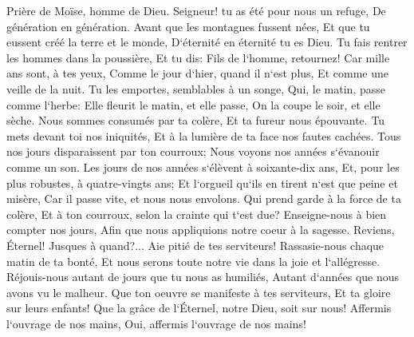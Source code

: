 \verse Prière de Moïse, homme de Dieu. Seigneur! tu as été pour nous un refuge, De génération en génération. 
\verse Avant que les montagnes fussent nées, Et que tu eussent créé la terre et le monde, D`éternité en éternité tu es Dieu. 
\verse Tu fais rentrer les hommes dans la poussière, Et tu dis: Fils de l`homme, retournez! 
\verse Car mille ans sont, à tes yeux, Comme le jour d`hier, quand il n`est plus, Et comme une veille de la nuit. 
\verse Tu les emportes, semblables à un songe, Qui, le matin, passe comme l`herbe: 
\verse Elle fleurit le matin, et elle passe, On la coupe le soir, et elle sèche. 
\verse Nous sommes consumés par ta colère, Et ta fureur nous épouvante. 
\verse Tu mets devant toi nos iniquités, Et à la lumière de ta face nos fautes cachées. 
\verse Tous nos jours disparaissent par ton courroux; Nous voyons nos années s`évanouir comme un son. 
\verse Les jours de nos années s`élèvent à soixante-dix ans, Et, pour les plus robustes, à quatre-vingts ans; Et l`orgueil qu`ils en tirent n`est que peine et misère, Car il passe vite, et nous nous envolons. 
\verse Qui prend garde à la force de ta colère, Et à ton courroux, selon la crainte qui t`est due? 
\verse Enseigne-nous à bien compter nos jours, Afin que nous appliquions notre coeur à la sagesse. 
\verse Reviens, Éternel! Jusques à quand?... Aie pitié de tes serviteurs! 
\verse Rassasie-nous chaque matin de ta bonté, Et nous serons toute notre vie dans la joie et l`allégresse. 
\verse Réjouis-nous autant de jours que tu nous as humiliés, Autant d`années que nous avons vu le malheur. 
\verse Que ton oeuvre se manifeste à tes serviteurs, Et ta gloire sur leurs enfants! 
\verse Que la grâce de l`Éternel, notre Dieu, soit sur nous! Affermis l`ouvrage de nos mains, Oui, affermis l`ouvrage de nos mains! 

\chapter{}

